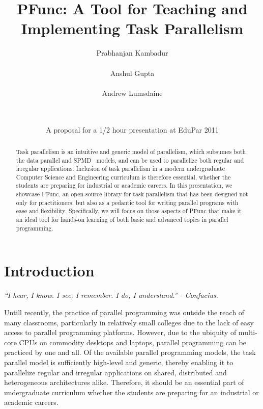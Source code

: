 \documentclass[9pt,twocolumn,letter]{article}
\begin{document}
\title{PFunc: A Tool for Teaching and Implementing Task Parallelism}

\date{A proposal for a 1/2 hour presentation at EduPar 2011}

\author{
  \alignauthor Prabhanjan Kambadur\\
  \\
  \alignauthor Anshul Gupta\\
  \\
  \alignauthor Andrew Lumsdaine\\
  \\
  \\
}

\maketitle


\begin{abstract} 
Task parallelism is an intuitive and generic model of parallelism, which
subsumes both the data parallel and SPMD~\cite{darema2001} models, and can be
used to parallelize both regular and irregular applications.
%
Inclusion of task parallelism in a modern undergraduate Computer Science and
Engineering curriculum is therefore essential, whether the students are
preparing for industrial or academic careers.
%
In this presentation, we showcase PFunc, an open-source library for
task parallelism that has been designed not only for practitioners, 
but also as
a pedantic tool for writing parallel programs with ease and flexibility.
%
Specifically, we will focus on those aspects of PFunc that make it an ideal 
tool for hands-on
learning of both basic and advanced topics in parallel programming.
\end{abstract}

\section{Introduction}
\begin{center}
\small{\textit{``I hear, I know. I see, I remember. I do, I understand.'' -
Confucius.}}
\end{center}
%
Untill recently, 
the practice of parallel programming was outside the reach of many 
classrooms, particularly in relatively small colleges
due to the lack of easy access to parallel programming platforms.
% 
However, due to the ubiquity of multi-core CPUs on commodity
desktops and laptops, parallel programming can be practiced by one and all.
Of the available parallel programming models, the task parallel model is 
sufficiently high-level and generic, thereby enabling it to parallelize regular
and irregular applications on shared, distributed and heterogeneous
architectures alike.  
%
Therefore, it should be an essential part of undergraduate curriculum whether
the students are preparing for an industrial or academic careers.
\end{document}
